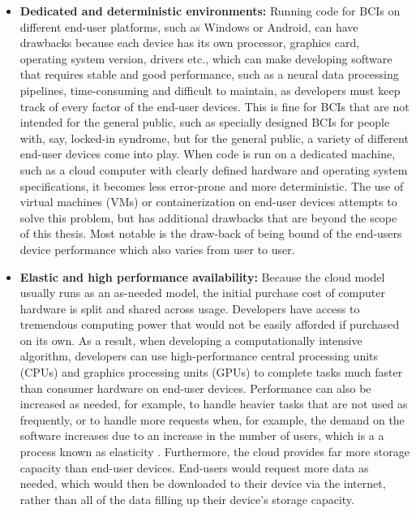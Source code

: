 \begin{itemize}
  \item \textbf{Dedicated and deterministic environments:} Running code for BCIs on different end-user platforms, such as Windows or Android, can have drawbacks because each device has its own processor, graphics card, operating system version, drivers etc., which can make developing software that requires stable and good performance, such as a neural data processing pipelines, time-consuming and difficult to maintain, as developers must keep track of every factor of the end-user devices. This is fine for BCIs that are not intended for the general public, such as specially designed BCIs for people with, say, locked-in syndrome, but for the general public, a variety of different end-user devices come into play. When code is run on a dedicated machine, such as a cloud computer with clearly defined hardware and operating system specifications, it becomes less error-prone and more deterministic. The use of virtual machines (VMs) or containerization on end-user devices attempts to solve this problem, but has additional drawbacks that are beyond the scope of this thesis. Most notable is the draw-back of being bound of the end-users device performance which also varies from user to user.
  \item \textbf{Elastic and high performance availability:} Because the cloud model usually runs as an as-needed model, the initial purchase cost of computer hardware is split and shared across usage. Developers have access to tremendous computing power that would not be easily afforded if purchased on its own. As a result, when developing a computationally intensive algorithm, developers can use high-performance central processing units (CPUs) and graphics processing units (GPUs) to complete tasks much faster than consumer hardware on end-user devices. Performance can also be increased as needed, for example, to handle heavier tasks that are not used as frequently, or to handle more requests when, for example, the demand on the software increases due to an increase in the number of users, which is a a process known as elasticity \citep{gartner_definition_nodate}. Furthermore, the cloud provides far more storage capacity than end-user devices. End-users would request more data as needed, which would then be downloaded to their device via the internet, rather than all of the data filling up their device's storage capacity.


\end{itemize}
